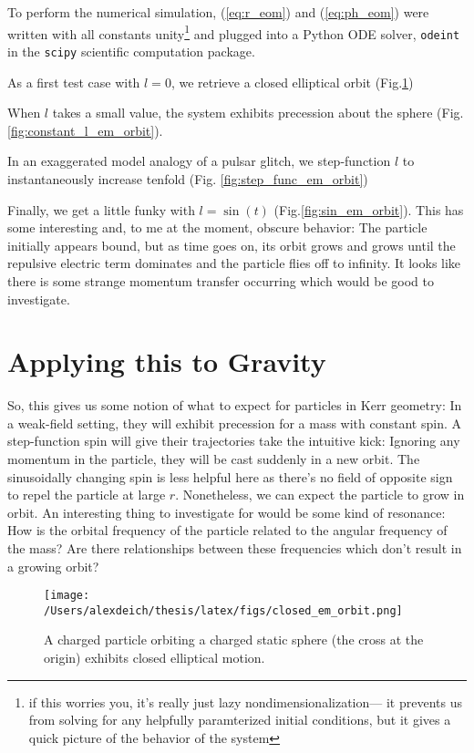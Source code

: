 \documentclass[11pt]{article}
\begin{document}
To perform the numerical simulation, (\ref{eq:r_eom}) and (\ref{eq:ph_eom}) were written with all constants unity\footnote{if this worries you, it's really just lazy nondimensionalization--- it prevents us from solving for any helpfully paramterized initial conditions, but it gives a quick picture of the behavior of the system} and plugged into a Python ODE solver, \texttt{odeint} in the \texttt{scipy} scientific computation package.



As a first test case with $l = 0$, we retrieve a closed elliptical orbit (Fig.\ref{fig:closed_em_orbit})


When $l$ takes a small value, the system exhibits precession about the sphere (Fig. \ref{fig:constant_l_em_orbit}).




In an exaggerated model analogy of a pulsar glitch, we step-function $l$ to instantaneously increase tenfold (Fig. \ref{fig:step_func_em_orbit})


Finally, we get a little funky with $l = \sin(t)$ (Fig.\ref{fig:sin_em_orbit}).  This has some interesting and, to me at the moment, obscure behavior:  The particle initially appears bound, but as time goes on, its orbit grows and grows until the repulsive electric term dominates and the particle flies off to infinity.  It looks like there is some strange momentum transfer occurring which would be good to investigate.

\section{Applying this to Gravity}
So, this gives us some notion of what to expect for particles in Kerr geometry:  In a weak-field setting, they will exhibit precession for a mass with constant spin.  A step-function spin will give their trajectories take the intuitive kick:  Ignoring any momentum in the particle, they will be cast suddenly in a new orbit.  The sinusoidally changing spin is less helpful here as there's no field of opposite sign to repel the particle at large $r$.  Nonetheless, we can expect the particle to grow in orbit.  An interesting thing to investigate for would be some kind of resonance:  How is the orbital frequency of the particle related to the angular frequency of the mass?  Are there relationships between these frequencies which don't result in a growing orbit?
\newpage
\begin{figure}[h]
  \begin{center}
    \texttt{[image: /Users/alexdeich/thesis/latex/figs/closed\_em\_orbit.png]}
  \end{center}
  \caption{A charged particle orbiting a charged static sphere (the cross at the origin) exhibits closed elliptical motion.}
  \label{fig:closed_em_orbit}
\end{figure}
\end{document}
